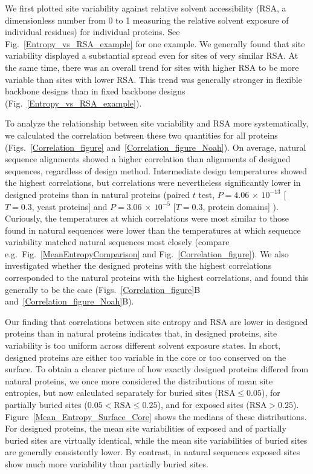 \documentclass[12pt]{article}
\begin{document}
We first plotted site variability against relative solvent accessibility (RSA, a dimensionless number from 0 to 1 measuring the relative solvent exposure of individual residues) for individual proteins. See Fig.~\ref{Entropy_vs_RSA_example} for one example. We generally found that site variability displayed a substantial spread even for sites of very similar RSA. At the same time, there was an overall trend for sites with higher RSA to be more variable than sites with lower RSA. This trend was generally stronger in flexible backbone designs than in fixed backbone designs (Fig.~\ref{Entropy_vs_RSA_example}).

To analyze the relationship between site variability and RSA more systematically, we calculated the correlation between these two quantities for all proteins (Figs.~\ref{Correlation_figure} and~\ref{Correlation_figure_Noah}). On average, natural sequence alignments showed a higher correlation than alignments of designed sequences, regardless of design method. Intermediate design temperatures showed the highest correlations, but correlations were nevertheless significantly lower in designed proteins than in natural proteins (paired $t$ test, $P=  4.06$  $\times$  $10^{-13}$ [$T=0.3$, yeast proteins] and $P= 3.06$ $\times$  $10^{-5} $ [$T=0.3$, protein domains] ). Curiously, the temperatures at which correlations were most similar to those found in natural sequences were lower than the temperatures at which sequence variability matched natural sequences most closely (compare e.g.\ Fig.~\ref{MeanEntropyComparison} and Fig.~\ref{Correlation_figure}). We also investigated whether the designed proteins with the highest correlations corresponded to the natural proteins with the highest correlations, and found this generally to be the case (Figs.~\ref{Correlation_figure}B and~\ref{Correlation_figure_Noah}B).

Our finding that correlations between site entropy and RSA are lower in designed proteins than in natural proteins indicates that, in designed proteins, site variability is too uniform across different solvent exposure states. In short, designed proteins are either too variable in the core or too conserved on the surface. To obtain a clearer picture of how exactly designed proteins differed from natural proteins, we once more considered the distributions of mean site entropies, but now calculated separately for buried sites ($\text{RSA}\leq0.05$), for partially buried sites ($0.05<\text{RSA}\leq0.25$), and for exposed sites ($\text{RSA}>0.25$). Figure~\ref{Mean_Entropy_Surface_Core} shows the medians of these distributions. For designed proteins, the mean site variabilities of exposed and of partially buried sites are virtually identical, while the mean site variabilities of buried sites are generally consistently lower. By contrast, in natural sequences exposed sites show much more variability than partially buried sites.
\end{document}
